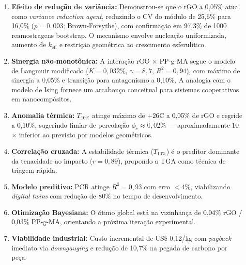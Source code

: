 \documentclass[12pt,a4paper,twoside]{article}
\begin{document}
\begin{enumerate}[leftmargin=*]
    \item \textbf{Efeito de redução de variância:} Demonstrou-se que o rGO a 0,05\% atua como \textit{variance reduction agent}, reduzindo o CV do módulo de 25,6\% para 16,0\% ($p = 0,003$; Brown-Forsythe), com confirmação em 97,3\% de 1000 reamostragens bootstrap. O mecanismo envolve nucleação uniformizada, aumento de $k_{\text{eff}}$ e restrição geométrica ao crescimento esferulítico.
    
    \item \textbf{Sinergia não-monotônica:} A interação rGO $\times$ PP-g-MA segue o modelo de Langmuir modificado ($K = 0,032\%$, $\gamma = 8,7$, $R^2 = 0,94$), com máximo de sinergia a 0,05\% e transição para antagonismo a 0,10\%. A analogia com o modelo de Ising fornece um arcabouço conceitual para sistemas cooperativos em nanocompósitos.
    
    \item \textbf{Anomalia térmica:} $T_{10\%}$ atinge máximo de $+26$\textdegree C a 0,05\% de rGO e regride a 0,10\%, sugerindo limiar de percolação $\phi_c \approx 0,02\%$ — aproximadamente 10$\times$ inferior ao previsto por modelos geométricos.
    
    \item \textbf{Correlação cruzada:} A estabilidade térmica ($T_{10\%}$) é o preditor dominante da tenacidade ao impacto ($r = 0,89$), propondo a TGA como técnica de triagem rápida.
    
    \item \textbf{Modelo preditivo:} PCR atinge $R^2 = 0,93$ com erro $<4\%$, viabilizando \textit{digital twins} com redução de 80\% no tempo de desenvolvimento.
    
    \item \textbf{Otimização Bayesiana:} O ótimo global está na vizinhança de 0,04\% rGO / 0,03\% PP-g-MA, orientando a próxima iteração experimental.
    
    \item \textbf{Viabilidade industrial:} Custo incremental de US\$ 0,12/kg com \textit{payback} imediato via \textit{downgauging} e redução de 10,7\% na pegada de carbono por peça.
\end{enumerate}
\end{document}
